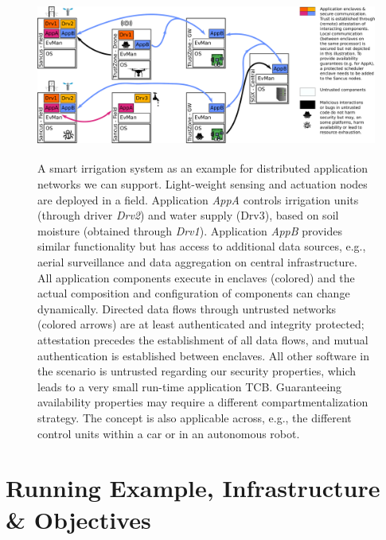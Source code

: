 \begin{figure}[ht!]
    \includegraphics[height=55mm]{graphics/20210808-scenario.pdf}
    \caption{A smart irrigation system as an example for distributed application
  networks we can support. Light-weight sensing and actuation nodes are deployed
  in a field. Application \emph{AppA} controls irrigation units (through driver
  \emph{Drv2}) and water supply (Drv3), based on soil moisture (obtained through
  \emph{Drv1}). Application \emph{AppB} provides similar functionality but has
  access to additional data sources, e.g., aerial surveillance and data
  aggregation on central infrastructure. All application components execute in
  enclaves (colored) and the actual composition and configuration of components
  can change dynamically. Directed data flows through untrusted networks
  (colored arrows) are at least authenticated and integrity protected;
  attestation precedes the establishment of all data flows, and mutual
  authentication is established between enclaves. All other software in the
  scenario is untrusted regarding our security properties, which leads to a very
  small run-time application \ac{TCB}. Guaranteeing availability properties may
  require a different compartmentalization strategy. The concept is also
  applicable across, e.g., the different control units within a car or in an
  autonomous robot.}
    \label{fig:scenario}
  \end{figure}



\section{Running Example, Infrastructure \& Objectives}
\label{sec:system}

